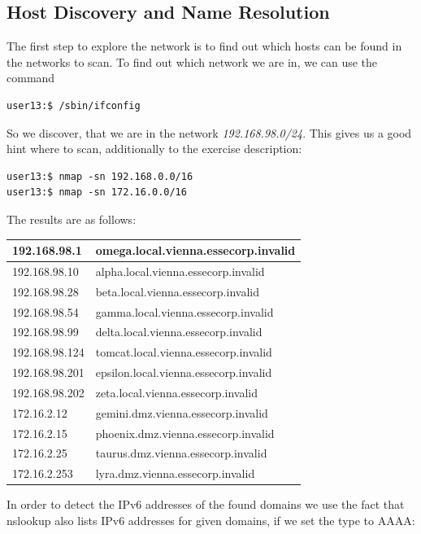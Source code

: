 \documentclass[12pt,a4paper,titlepage,oneside]{scrartcl}
\begin{document}
\subsection{Host Discovery and Name Resolution}
The first step to explore the network is to find out which hosts can be found in the networks to scan. To find out which network we are in, we can use the command

\begin{lstlisting}[style=simple]
user13:$ /sbin/ifconfig 
\end{lstlisting}

So we discover, that we are in the network \emph{192.168.98.0/24}. This gives us a good hint where to scan, additionally to the exercise description:

\begin{lstlisting}[style=simple]
user13:$ nmap -sn 192.168.0.0/16
user13:$ nmap -sn 172.16.0.0/16
\end{lstlisting}

The results are as follows:

\begin{tabular}{| l | l |}
\hline
192.168.98.1 & omega.local.vienna.essecorp.invalid \\ \hline
192.168.98.10 & alpha.local.vienna.essecorp.invalid \\ \hline
192.168.98.28 & beta.local.vienna.essecorp.invalid \\ \hline
192.168.98.54 & gamma.local.vienna.essecorp.invalid \\ \hline
192.168.98.99 & delta.local.vienna.essecorp.invalid \\ \hline
192.168.98.124 & tomcat.local.vienna.essecorp.invalid \\ \hline
192.168.98.201 & epsilon.local.vienna.essecorp.invalid \\ \hline
192.168.98.202 & zeta.local.vienna.essecorp.invalid \\ \hline
172.16.2.12 & gemini.dmz.vienna.essecorp.invalid \\ \hline
172.16.2.15 & phoenix.dmz.vienna.essecorp.invalid \\ \hline
172.16.2.25 & taurus.dmz.vienna.essecorp.invalid \\ \hline
172.16.2.253 & lyra.dmz.vienna.essecorp.invalid \\ \hline
\end{tabular}

In order to detect the IPv6 addresses of the found domains we use the fact that nslookup also lists IPv6 addresses for given domains, if we set the type to AAAA:
\end{document}
